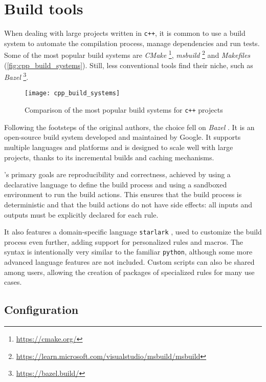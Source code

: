\section{Build tools}

When dealing with large projects written in \texttt{c++}, it is common to use a build system to automate the compilation process, manage dependencies and run tests.
Some of the most popular build systems are \textit{CMake} \footnote{\url{https://cmake.org/}}, \textit{msbuild} \footnote{\url{https://learn.microsoft.com/visualstudio/msbuild/msbuild}} and \textit{Makefiles} (\autoref{fig:cpp_build_systems}).
Still, less conventional tools find their niche, such as \textit{Bazel} \footnote{\url{https://bazel.build/}}.

\begin{figure}[h]
    \centering
    \texttt{[image: cpp\_build\_systems]}
    \caption{Comparison of the most popular build systems for \texttt{c++} projects \cite{art:cpp-build-system}}\label{fig:cpp_build_systems}
\end{figure}

Following the footsteps of the original authors, the choice fell on \textit{Bazel} \cite{repo:bazel}.
It is an open-source build system developed and maintained by Google.
It supports multiple languages and platforms and is designed to scale well with large projects, thanks to its incremental builds and caching mechanisms.

\bazel's primary goals are reproducibility and correctness, achieved by using a declarative language to define the build process and using a sandboxed environment to run the build actions.
This ensures that the build process is deterministic and that the build actions do not have side effects: all inputs and outputs must be explicitly declared for each rule.

It also features a domain-specific language \texttt{starlark} \cite{repo:starlark}, used to customize the build process even further, adding support for personalized rules and macros.
The syntax is intentionally very similar to the familiar \texttt{python}, although some more advanced language features are not included.
Custom scripts can also be shared among users, allowing the creation of packages of specialized rules for many use cases.

\subsection*{Configuration}

